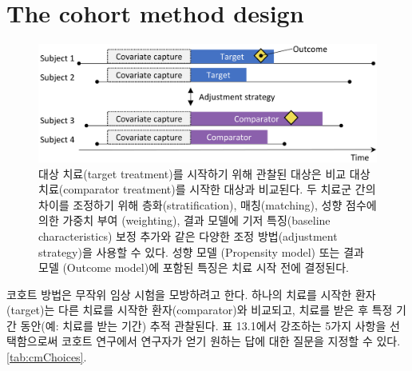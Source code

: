 \documentclass[]{book}
\begin{document}
\hypertarget{CohortMethod}{%
\section{The cohort method design}\label{CohortMethod}}


\begin{figure}

{\centering \includegraphics[width=0.9\linewidth]{images/PopulationLevelEstimation/cohortMethod} 

}

\caption{대상 치료(target treatment)를 시작하기 위해 관찰된 대상은 비교 대상 치료(comparator treatment)를 시작한 대상과 비교된다. 두 치료군 간의 차이를 조정하기 위해 층화(stratification), 매칭(matching), 성향 점수에 의한 가중치 부여 (weighting), 결과 모델에 기저 특징(baseline characteristics) 보정 추가와 같은 다양한 조정 방법(adjustment strategy)을 사용할 수 있다. 성향 모델 (Propensity model) 또는 결과 모델 (Outcome model)에 포함된 특징은 치료 시작 전에 결정된다.}\label{fig:cohortMethod}
\end{figure}

코호트 방법은 무작위 임상 시험을 모방하려고 한다\citep{hernan_2016}. 하나의 치료를 시작한 환자(target)는 다른 치료를 시작한 환자(comparator)와 비교되고, 치료를 받은 후 특정 기간 동안(예: 치료를 받는 기간) 추적 관찰된다. 표 13.1에서 강조하는 5가지 사항을 선택함으로써 코호트 연구에서 연구자가 얻기 원하는 답에 대한 질문을 지정할 수 있다. \ref{tab:cmChoices}.   
\end{document}
